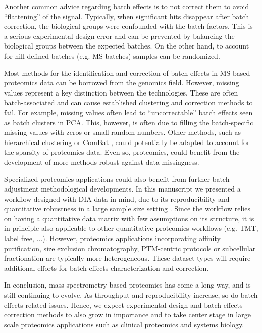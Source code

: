\documentclass[num-refs]{wiley-article}
\begin{document}
Another common advice regarding batch effects is to not correct them to avoid “flattening” of the signal. Typically, when significant hits disappear after batch correction, the biological groups were confounded with the batch factors. This is a serious experimental design error and can be prevented by balancing the biological groups between the expected batches. On the other hand, to account for hill defined batches (e.g. MS-batches) samples can be randomized.

Most methods for the identification and correction of batch effects in MS-based proteomics data can be borrowed from the genomics field. However, missing values represent a key distinction between the technologies. These are often batch-associated and can cause established clustering and correction methods to fail. For example, missing values often lead to “uncorrectable” batch effects seen as batch clusters in PCA. This, however, is often due to filling the batch-specific missing values with zeros or small random numbers. Other methods, such as hierarchical clustering or ComBat \cite{Johnston2005a}, could potentially be adapted to account for the sparsity of proteomics data. Even so, proteomics, could benefit from the development of more methods robust against data missingness.

Specialized proteomics applications could also benefit from further batch adjustment methodological developments. In this manuscript we presented a workflow designed with DIA data in mind, due to its reproducibility and quantitative robustness in a large sample size setting \cite{Collins2017}. Since the workflow relies on having a quantitative data matrix with few assumptions on its structure, it is in principle also applicable to other quantitative proteomics workflows (e.g. TMT, label free, ...). However, proteomics applications incorporating affinity purification, size exclusion chromatography, PTM-centric protocols or subcellular fractionation are typically more heterogeneous. These dataset types will require additional efforts for batch effects characterization and correction.

In conclusion, mass spectrometry based proteomics has come a long way, and is still continuing to evolve. As throughput and reproducibility increase, so do batch effects-related issues. Hence, we expect experimental design and batch effects correction methods to also grow in importance and to take center stage in  large scale proteomics applications such as clinical proteomics and systems biology.
\end{document}

